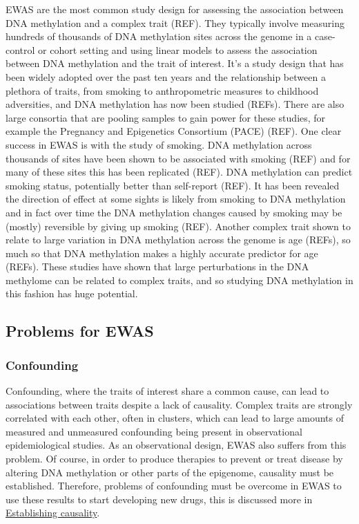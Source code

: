 \documentclass[11pt,twoside]{bristolthesis}
\begin{document}
EWAS are the most common study design for assessing the association between DNA methylation and a complex trait (REF). They typically involve measuring hundreds of thousands of DNA methylation sites across the genome in a case-control or cohort setting and using linear models to assess the association between DNA methylation and the trait of interest. It's a study design that has been widely adopted over the past ten years and the relationship between a plethora of traits, from smoking to anthropometric measures to childhood adversities, and DNA methylation has now been studied (REFs). There are also large consortia that are pooling samples to gain power for these studies, for example the Pregnancy and Epigenetics Consortium (PACE) (REF). One clear success in EWAS is with the study of smoking. DNA methylation across thousands of sites have been shown to be associated with smoking (REF) and for many of these sites this has been replicated (REF). DNA methylation can predict smoking status, potentially better than self-report (REF). It has been revealed the direction of effect at some sights is likely from smoking to DNA methylation and in fact over time the DNA methylation changes caused by smoking may be (mostly) reversible by giving up smoking (REF). Another complex trait shown to relate to large variation in DNA methylation across the genome is age (REFs), so much so that DNA methylation makes a highly accurate predictor for age (REFs). These studies have shown that large perturbations in the DNA methylome can be related to complex traits, and so studying DNA methylation in this fashion has huge potential.

\hypertarget{problems-for-ewas}{%
\subsection{Problems for EWAS}\label{problems-for-ewas}}

\hypertarget{confounding}{%
\subsubsection{Confounding}\label{confounding}}

Confounding, where the traits of interest share a common cause, can lead to associations between traits despite a lack of causality. Complex traits are strongly correlated with each other, often in clusters, which can lead to large amounts of measured and unmeasured confounding being present in observational epidemiological studies. As an observational design, EWAS also suffers from this problem. Of course, in order to produce therapies to prevent or treat disease by altering DNA methylation or other parts of the epigenome, causality must be established. Therefore, problems of confounding must be overcome in EWAS to use these results to start developing new drugs, this is discussed more in \protect\hyperlink{establishing-causality}{Establishing causality}.
\end{document}
